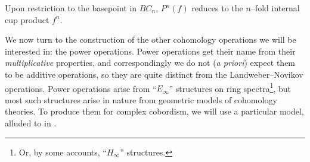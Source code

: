 \begin{remark}
Upon restriction to the basepoint in $BC_n$, $P^n(f)$ reduces to the $n$--fold internal cup product $f^{n}$.
\end{remark}










We now turn to the construction of the other cohomology operations we will be interested in: the power operations.  Power operations get their name from their \emph{multiplicative} properties, and correspondingly we do not (\textit{a priori}) expect them to be additive operations, so they are quite distinct from the Landweber--Novikov operations.  Power operations arise from ``$E_\infty$'' structures on ring spectra\footnote{Or, by some accounts, ``$H_\infty$'' structures.}, but most such structures arise in nature from geometric models of cohomology theories.  To produce them for complex cobordism, we will use a particular model, alluded to in .


